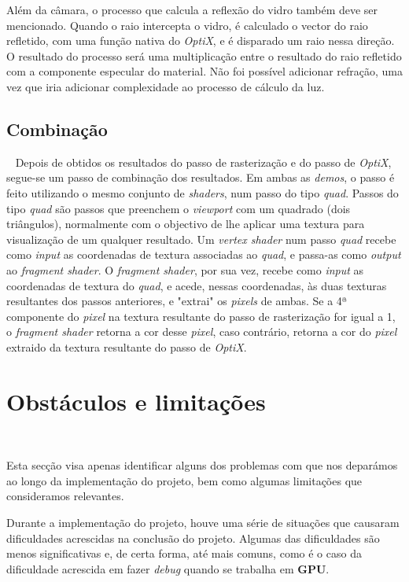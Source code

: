 \documentclass[10pt]{article}
\begin{document}
Além da câmara, o processo que calcula a reflexão do vidro também deve ser mencionado. Quando o raio intercepta o vidro, é calculado o vector do raio refletido, com uma função nativa do \textit{OptiX}, e é disparado um raio nessa direção. O resultado do processo será uma multiplicação entre o resultado do raio refletido com a componente especular do material. Não foi possível adicionar refração, uma vez que iria adicionar complexidade ao processo de cálculo da luz.

\subsection{Combinação}~
Depois de obtidos os resultados do passo de rasterização e do passo de \textit{OptiX}, segue-se um passo de combinação dos resultados. Em ambas as \textit{demos}, o passo é feito utilizando o mesmo conjunto de \textit{shaders}, num passo do tipo \textit{quad}. Passos do tipo \textit{quad} são passos que preenchem o \textit{viewport} com um quadrado (dois triângulos), normalmente com o objectivo de lhe aplicar uma textura para visualização de um qualquer resultado. Um \textit{vertex shader} num passo \textit{quad} recebe como \textit{input} as coordenadas de textura associadas ao \textit{quad}, e passa-as como \textit{output} ao \textit{fragment shader}. O \textit{fragment shader}, por sua vez, recebe como \textit{input} as coordenadas de textura do \textit{quad}, e acede, nessas coordenadas, às duas texturas resultantes dos passos anteriores, e "extrai" os \textit{pixels} de ambas. Se a 4ª componente do \textit{pixel} na textura resultante do passo de rasterização for igual a 1, o \textit{fragment shader} retorna a cor desse \textit{pixel}, caso contrário, retorna a cor do \textit{pixel} extraido da textura resultante do passo de \textit{OptiX}.


\section{Obstáculos e limitações}~ \label{sec:oel}

Esta secção visa apenas identificar alguns dos problemas com que nos deparámos ao longo da implementação do projeto, bem como algumas limitações que consideramos relevantes.

Durante a implementação do projeto, houve uma série de situações que causaram dificuldades acrescidas na conclusão do projeto. Algumas das dificuldades são menos significativas e, de certa forma, até mais comuns, como é o caso da dificuldade acrescida em fazer \textit{debug} quando se trabalha em \textbf{GPU}.
\end{document}

